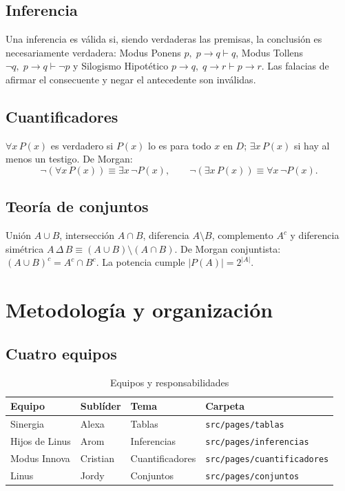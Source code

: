 \documentclass[11pt,a4paper,openany]{book}
\begin{document}
\section{Inferencia}
Una inferencia es v\'alida si, siendo verdaderas las premisas, la conclusi\'on es necesariamente verdadera: Modus Ponens $p,\; p \to q \vdash q$, Modus Tollens $\lnot q,\; p \to q \vdash \lnot p$ y Silogismo Hipot\'etico $p \to q,\; q \to r \vdash p \to r$. Las falacias de afirmar el consecuente y negar el antecedente son inv\'alidas.
\section{Cuantificadores}
$\forall x\,P(x)$ es verdadero si $P(x)$ lo es para todo $x$ en $D$; $\exists x\,P(x)$ si hay al menos un testigo. De Morgan:
\begin{equation}
\lnot(\forall x\,P(x)) \equiv \exists x\,\lnot P(x), \qquad \lnot(\exists x\,P(x)) \equiv \forall x\,\lnot P(x).
\end{equation}
\section{Teor\'ia de conjuntos}
Uni\'on $A \cup B$, intersecci\'on $A \cap B$, diferencia $A \setminus B$, complemento $A^{c}$ y diferencia sim\'etrica $A \,\Delta\, B \equiv (A \cup B) \setminus (A \cap B)$. De Morgan conjuntista: $(A \cup B)^{c} = A^{c} \cap B^{c}$. La potencia cumple $|P(A)| = 2^{|A|}$.

\chapter{Metodolog\'ia y organizaci\'on}
\label{ch:metodo}
\section{Cuatro equipos}
\begin{table}[H]
\centering
\caption{Equipos y responsabilidades}
\begin{tabular}{llll}
\toprule
Equipo & Subl\'ider & Tema & Carpeta \\
\midrule
Sinergia & Alexa & Tablas & \texttt{src/pages/tablas} \\
Hijos de Linus & Arom & Inferencias & \texttt{src/pages/inferencias} \\
Modus Innova & Cristian & Cuantificadores & \texttt{src/pages/cuantificadores} \\
Linus & Jordy & Conjuntos & \texttt{src/pages/conjuntos} \\
\bottomrule
\end{tabular}
\end{table}
\end{document}
